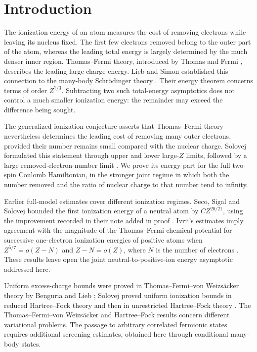 \section{Introduction}\label{sec:introduction}

The ionization energy of an atom measures the cost of removing electrons
while leaving its nucleus fixed. The first few electrons removed belong to
the outer part of the atom, whereas the leading total energy is largely
determined by the much denser inner region. Thomas--Fermi theory, introduced
by Thomas and Fermi \cite{Thomas1927,Fermi1927}, describes the leading
large-charge energy. Lieb and Simon established this connection to the
many-body Schr\"odinger theory \cite{LiebSimon1973,LiebSimon1977}.
Their energy theorem \cite[Theorem~III.1]{LiebSimon1977} concerns terms of
order $Z^{7/3}$. Subtracting two such total-energy asymptotics does not
control a much smaller ionization energy: the remainder may exceed the
difference being sought.

The generalized ionization conjecture asserts that Thomas--Fermi theory
nevertheless determines the leading cost of removing many outer electrons,
provided their number remains small compared with the nuclear charge.
Solovej formulated this statement through upper and lower large-$Z$ limits,
followed by a large removed-electron-number limit
\cite[Section~3, Equation~(1)]{Solovej2016}. We prove its energy part for
the full two-spin Coulomb Hamiltonian, in the stronger joint regime in which
both the number removed and the ratio of nuclear charge to that number
tend to infinity.

Earlier full-model estimates cover different ionization regimes. Seco,
Sigal and Solovej bounded the first ionization energy of a neutral atom
by $CZ^{20/21}$, using the improvement recorded in their note added in
proof \cite[Theorem~1 and p.~315]{SecoSigalSolovej1990}.
Ivrii's estimates imply agreement with the magnitude of the Thomas--Fermi
chemical potential for successive one-electron ionization energies of positive
atoms when $Z^{5/7}=o(Z-N)$ and $Z-N=o(Z)$, where $N$ is the number of
electrons \cite[Theorem~6.2.1]{Ivrii2017}. These results leave open the
joint neutral-to-positive-ion energy asymptotic addressed here.

Uniform excess-charge bounds were proved in
Thomas--Fermi--von Weizs\"acker theory by Benguria and Lieb
\cite{BenguriaLieb1985}; Solovej proved uniform ionization bounds in reduced
Hartree--Fock theory \cite{Solovej1991} and then in unrestricted
Hartree--Fock theory \cite{Solovej2003}. The Thomas--Fermi--von Weizs\"acker
and Hartree--Fock results concern different variational problems. The passage to
arbitrary correlated fermionic states requires additional screening
estimates, obtained here through conditional many-body states.

